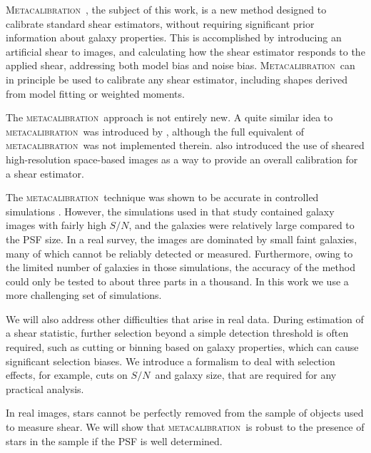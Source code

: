 \documentclass[iop]{emulateapj}
\newcommand{\snr}{$S/N$}
\newcommand{\mcal}{\textsc{metacalibration}}
\newcommand{\Mcal}{\textsc{Metacalibration}}
\begin{document}
\Mcal\ \citep{HuffMcal}, the subject of this work, is a new method designed to
calibrate standard shear estimators, without requiring significant prior
information about galaxy properties.  This is accomplished by introducing an
artificial shear to images, and calculating how the shear estimator responds to
the applied shear, addressing both model bias and noise bias.  \Mcal\ can in
principle be used to calibrate any shear estimator, including shapes derived
from model fitting or weighted moments.

The \mcal\ approach is not entirely new. A quite similar idea to \mcal\ was
introduced by \cite{Kaiser2000}, although the full equivalent of \mcal\ was not
implemented therein.  \cite{ksb95} also introduced the use of sheared
high-resolution space-based images as a way to provide an overall calibration
for a shear estimator.



The \mcal\ technique was shown to be accurate in controlled simulations
\citep{HuffMcal}.  However, the simulations used in that study \citep[based on
those used in][]{great3} contained galaxy images with fairly high \snr, and the
galaxies were relatively large compared to the PSF size.  In a real survey, the
images are dominated by small faint galaxies, many of which cannot be reliably
detected or measured.  Furthermore, owing to the limited number of galaxies in
those simulations, the accuracy of the method could only be tested to about
three parts in a thousand.  In this work we use a more challenging set of
simulations.

We will also address other difficulties that arise in real data.  During
estimation of a shear statistic, further selection beyond a simple detection
threshold is often required, such as cutting or binning based on galaxy
properties, which can cause significant selection biases.  We introduce a
formalism to deal with selection effects, for example, cuts on \snr\ and galaxy
size, that are required for any practical analysis. 

In real images, stars cannot be perfectly removed from the sample of objects
used to measure shear. We will show that \mcal\ is robust to the presence of
stars in the sample if the PSF is well determined.
\end{document}
